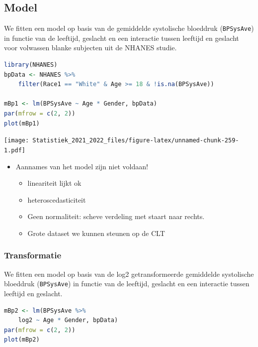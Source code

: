 \documentclass[
  12pt,dutch,coursenotes]{book}
\newcommand{\passthrough}[1]{#1}
\providecommand{\tightlist}{%
  \setlength{\itemsep}{0pt}\setlength{\parskip}{0pt}}
\theoremstyle{definition}
\theoremstyle{definition}
\theoremstyle{definition}
\theoremstyle{definition}
\theoremstyle{remark}
\begin{document}
\hypertarget{model-3}{%
\subsection{Model}\label{model-3}}

We fitten een model op basis van de gemiddelde systolische bloeddruk (\passthrough{\lstinline!BPSysAve!}) in functie van de leeftijd, geslacht en een interactie tussen leeftijd en geslacht voor volwassen blanke subjecten uit de NHANES studie.

\begin{lstlisting}[language=R]
library(NHANES)
bpData <- NHANES %>%
    filter(Race1 == "White" & Age >= 18 & !is.na(BPSysAve))

mBp1 <- lm(BPSysAve ~ Age * Gender, bpData)
par(mfrow = c(2, 2))
plot(mBp1)
\end{lstlisting}

\texttt{[image: Statistiek\_2021\_2022\_files/figure-latex/unnamed-chunk-259-1.pdf]}

\begin{itemize}
\item
  Aannames van het model zijn niet voldaan!

  \begin{itemize}
  \tightlist
  \item
    lineariteit lijkt ok
  \item
    heteroscedasticiteit
  \item
    Geen normaliteit: scheve verdeling met staart naar rechts.
  \item
    Grote dataset we kunnen steunen op de CLT
  \end{itemize}
\end{itemize}

\hypertarget{transformatie}{%
\subsubsection{Transformatie}\label{transformatie}}

We fitten een model op basis van de log2 getransformeerde gemiddelde systolische bloeddruk (\passthrough{\lstinline!BPSysAve!}) in functie van de leeftijd, geslacht en een interactie tussen leeftijd en geslacht.

\begin{lstlisting}[language=R]
mBp2 <- lm(BPSysAve %>%
    log2 ~ Age * Gender, bpData)
par(mfrow = c(2, 2))
plot(mBp2)
\end{lstlisting}
\end{document}
